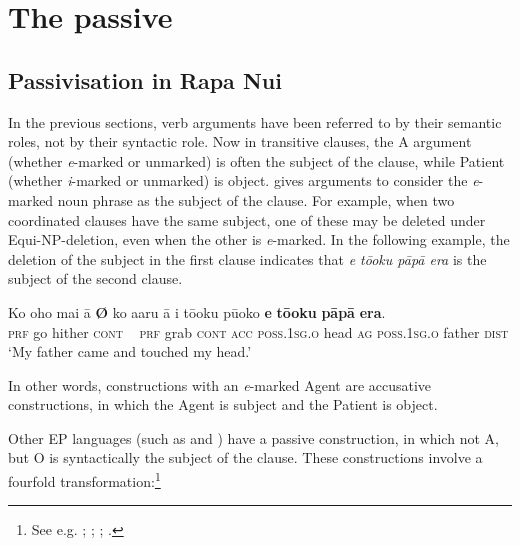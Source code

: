 \section{The passive}\label{sec:8.5}
\subsection{Passivisation in Rapa Nui}\label{sec:8.5.1}
In the previous sections, verb arguments have been referred to by their semantic roles, not by their syntactic role. Now in transitive clauses, the A argument (whether \textit{e}{}-marked or unmarked) is often the subject of the clause, while Patient (whether \textit{i}{}-marked or unmarked) is object. \citet[136–137]{Alexander1981OL} gives arguments to consider the \textit{e}-marked noun phrase as the subject of the clause. For example, when two coordinated clauses have the same subject, one of these may be deleted under Equi-NP{}-deletion, even when the other is \textit{e}{}-marked. In the following example, the deletion of the subject in the first clause indicates that \textit{e \mbox{tō{\ꞌ}oku} pāpā era} is the subject of the second clause.

\ea\label{ex:8.45}
\gll Ko oho mai {\ꞌ}ā \textbf{\textup{Ø}} ko {\ꞌ}a{\ꞌ}aru {\ꞌ}ā i tō{\ꞌ}oku pū{\ꞌ}oko \textbf{e} \textbf{tō{\ꞌ}oku} \textbf{pāpā} \textbf{era}.\\
\textsc{prf} go hither \textsc{cont} ~ \textsc{prf} grab \textsc{cont} \textsc{acc} \textsc{poss.1sg.o} head \textsc{ag} \textsc{poss.1sg.o} father \textsc{dist}\\

\glt
‘My father came and touched my head.’  
\z

In other words, constructions with an \textit{e}{}-marked Agent are accusative constructions, in which the Agent is subject and the Patient is object.

Other EP languages (such as  and ) have a passive construction, in which not A, but O is syntactically the subject of the clause. These constructions involve a fourfold transformation:\footnote{\label{fn:412}See e.g. \citet[53]{WeberN2003}; \citet[67]{Clark1976}; \citet[171]{Harlow2007Maori}; \citet[90]{Harlow2007Subject}.}

